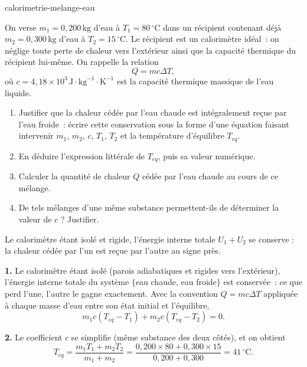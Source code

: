 \begin{exo}{calorimetrie-melange-eau}

On verse $m_1 = 0{,}200\,\text{kg}$ d'eau à $T_1 = 80\,^\circ\text{C}$ dans un récipient contenant déjà $m_2 = 0{,}300\,\text{kg}$ d'eau à $T_2 = 15\,^\circ\text{C}$. Le récipient est un calorimètre idéal~: on néglige toute perte de chaleur vers l'extérieur ainsi que la capacité thermique du récipient lui-même. On rappelle la relation
\[
Q = mc\Delta T,
\]
où $c = 4{,}18\times10^3\,\text{J}\!\cdot\!\text{kg}^{-1}\!\cdot\!\text{K}^{-1}$ est la capacité thermique massique de l'eau liquide.

\begin{enumerate}
  \item Justifier que la chaleur cédée par l'eau chaude est intégralement reçue par l'eau froide~: écrire cette conservation sous la forme d'une équation faisant intervenir $m_1$, $m_2$, $c$, $T_1$, $T_2$ et la température d'équilibre $T_{eq}$.
  \item En déduire l'expression littérale de $T_{eq}$, puis sa valeur numérique.
  \item Calculer la quantité de chaleur $Q$ cédée par l'eau chaude au cours de ce mélange.
  \item De tels mélanges d'une même substance permettent-ils de déterminer la valeur de $c$ ? Justifier.
\end{enumerate}

\begin{indication}
Le calorimètre étant isolé et rigide, l'énergie interne totale $U_1 + U_2$ se conserve : la chaleur cédée par l'un est reçue par l'autre au signe près.
\end{indication}

\begin{solution}
\textbf{1.} Le calorimètre étant isolé (parois adiabatiques et rigides vers l'extérieur), l'énergie interne totale du système $\{$eau chaude, eau froide$\}$ est conservée~: ce que perd l'une, l'autre le gagne exactement. Avec la convention $Q = mc\Delta T$ appliquée à chaque masse d'eau entre son état initial et l'équilibre,
\[
m_1 c (T_{eq} - T_1) + m_2 c (T_{eq} - T_2) = 0.
\]

\textbf{2.} Le coefficient $c$ se simplifie (même substance des deux côtés), et on obtient
\[
T_{eq} = \frac{m_1 T_1 + m_2 T_2}{m_1 + m_2}
= \frac{0{,}200 \times 80 + 0{,}300 \times 15}{0{,}200 + 0{,}300}
= 41\,^\circ\text{C}.
\]


\end{solution}
\end{exo}

